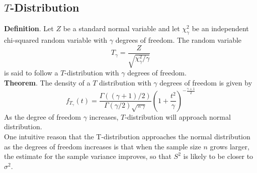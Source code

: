 \documentclass[a4paper,12pt]{article}
\begin{document}
\subsection{$T$-Distribution}
\textbf{Definition}. Let $Z$ be a standard normal variable and let $\chi_\gamma^2$ be an independent chi-squared random variable with $\gamma$ degrees of freedom. The random variable
\begin{equation}
T_\gamma=\frac{Z}{\sqrt{\chi_\gamma^2 / \gamma}}
\end{equation}
is said to follow a $T$-distribution with $\gamma$ degrees of freedom.\\
\textbf{Theorem}. The density of a $T$ distribution with $\gamma$ degrees of freedom is given by
\begin{equation}
f_{T_\gamma}(t)=\frac{\Gamma((\gamma+1) / 2)}{\Gamma(\gamma / 2) \sqrt{\pi \gamma}}\left(1+\frac{t^2}{\gamma}\right)^{-\frac{\gamma+1}{2}}
\end{equation}
As the degree of freedom $\gamma$ increases, $T$-distribution will approach normal distribution.\\
One intuitive reason that the T-distribution approaches the normal distribution as the degrees of freedom increases is that when the sample size $n$ grows larger, the estimate for the sample variance improves, so that $S^2$ is likely to be closer to $\sigma^2$.
\end{document}
